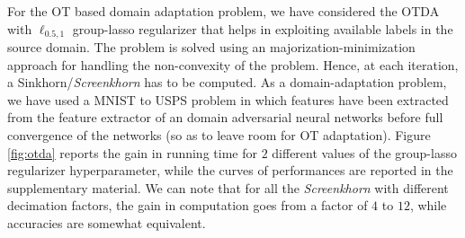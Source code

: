 For the OT based domain adaptation problem, we have considered the
OTDA with $\ell_{0.5,1}$ group-lasso regularizer that helps in exploiting available labels in the source domain. The problem is solved using an majorization-minimization approach 
for handling the non-convexity of the problem. Hence, at each iteration, a Sinkhorn/\emph{Screenkhorn} has to be computed. As a domain-adaptation problem, we have
used a MNIST to USPS problem in which features have been extracted from the
feature extractor of an domain adversarial neural networks \citep{ganin2016domain} before full convergence of the networks (so as to leave room for OT adaptation). 
Figure \ref{fig:otda} reports the gain in running time for $2$ different values
of the group-lasso regularizer hyperparameter, while the curves of performances are
reported in the supplementary material. We can note that for all the  \emph{Screenkhorn} with different decimation factors, the gain in computation goes from a factor of $4$ to $12$, while accuracies are somewhat equivalent.

